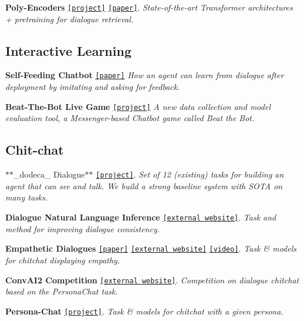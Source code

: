 \begin{DoxyItemize}
\item {\bfseries Poly-\/\+Encoders} \href{https://parl.ai/projects/polyencoder/}{\tt \mbox{[}project\mbox{]}} \href{https://arxiv.org/abs/1905.01969}{\tt \mbox{[}paper\mbox{]}}. {\itshape State-\/of-\/the-\/art Transformer architectures + pretraining for dialogue retrieval.}
\end{DoxyItemize}

\subsection*{Interactive Learning}


\begin{DoxyItemize}
\item {\bfseries Self-\/\+Feeding Chatbot} \href{https://arxiv.org/abs/1901.05415}{\tt \mbox{[}paper\mbox{]}} {\itshape How an agent can learn from dialogue after deployment by imitating and asking for feedback.}
\item {\bfseries Beat-\/\+The-\/\+Bot Live Game} \href{https://parl.ai/projects/beat_the_bot/}{\tt \mbox{[}project\mbox{]}} {\itshape A new data collection and model evaluation tool, a Messenger-\/based Chatbot game called Beat the Bot.}
\end{DoxyItemize}

\subsection*{Chit-\/chat}


\begin{DoxyItemize}
\item $\ast$$\ast$\+\_\+dodeca\+\_\+ Dialogue$\ast$$\ast$ \href{https://parl.ai/projects/dodecadialogue/}{\tt \mbox{[}project\mbox{]}}. {\itshape Set of 12 (existing) tasks for building an agent that can see and talk. We build a strong baseline system with S\+O\+TA on many tasks.}
\item {\bfseries Dialogue Natural Language Inference} \href{https://wellecks.github.io/dialogue_nli/}{\tt \mbox{[}external website\mbox{]}}. {\itshape Task and method for improving dialogue consistency.}
\item {\bfseries Empathetic Dialogues} \href{https://arxiv.org/abs/1811.00207}{\tt \mbox{[}paper\mbox{]}} \href{https://github.com/facebookresearch/EmpatheticDialogues}{\tt \mbox{[}external website\mbox{]}} \href{https://ai.facebook.com/blog/making-conversation-models-more-empathetic/}{\tt \mbox{[}video\mbox{]}}. {\itshape Task \& models for chitchat displaying empathy.}
\item {\bfseries Conv\+A\+I2 Competition} \href{http://convai.io/}{\tt \mbox{[}external website\mbox{]}}. {\itshape Competition on dialogue chitchat based on the Persona\+Chat task.}
\item {\bfseries Persona-\/\+Chat} \href{https://github.com/facebookresearch/ParlAI/tree/master/projects/personachat}{\tt \mbox{[}project\mbox{]}}. {\itshape Task \& models for chitchat with a given persona.}
\end{DoxyItemize}

